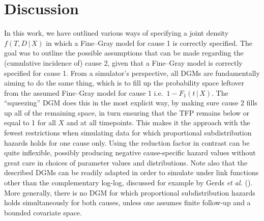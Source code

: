 \documentclass[
  letterpaper,
  paper=240mm:170mm,
  twoside=true,
  open=right,
  fontsize=10pt,
  pagesize=false,
  BCOR=15mm,
  DIV=14,
  headinclude=true,
  footinclude=false,
  headsepline=on]{scrbook}
\newcommand{\given}{\,|\,}
\begin{document}
\section{Discussion}\label{discussion}

In this work, we have outlined various ways of specifying a joint
density \(f(T, D \given X)\) in which a Fine--Gray model for cause 1 is
correctly specified. The goal was to outline the possible assumptions
that can be made regarding the (cumulative incidence of) cause 2, given
that a Fine--Gray model is correctly specified for cause 1. From a
simulator's perspective, all DGMs are fundamentally aiming to do the
same thing, which is to fill up the probability space leftover from the
assumed Fine--Gray model for cause 1 i.e.~\(1 - F_1(t \given X)\). The
``squeezing'' DGM does this in the most explicit way, by making sure
cause 2 fills up all of the remaining space, in turn ensuring that the
TFP remains below or equal to 1 for all \(X\) and at all timepoints.
This makes it the approach with the fewest restrictions when simulating
data for which proportional subdistribution hazards holds for one cause
only. Using the reduction factor in contrast can be quite inflexible,
possibly producing negative cause-specific hazard values without great
care in choices of parameter values and distributions. Note also that
the described DGMs can be readily adapted in order to simulate under
link functions other than the complementary log-log, discussed for
example by Gerds \emph{et al.}
(). More generally,
there is no DGM for which proportional subdistribution hazards holds
simultaneously for both causes, unless one assumes finite follow-up and
a bounded covariate space.
\end{document}
